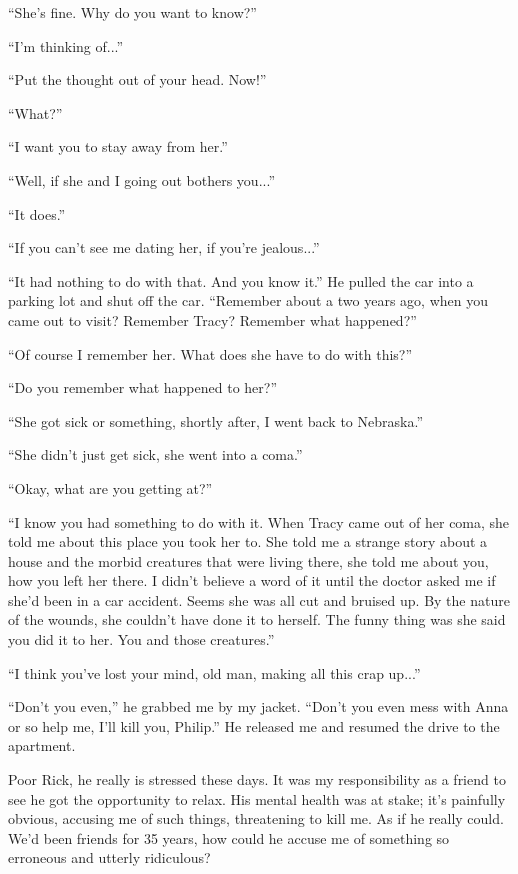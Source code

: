 \documentclass[
]{article}
\begin{document}
``She's fine. Why do you want to know?''

``I'm thinking of...''

``Put the thought out of your head. Now!''

``What?''

``I want you to stay away from her.''

``Well, if she and I going out bothers you...''

``It does.''

``If you can't see me dating her, if you're jealous...''

``It had nothing to do with that. And you know it.'' He pulled the car
into a parking lot and shut off the car. ``Remember about a two years
ago, when you came out to visit? Remember Tracy? Remember what
happened?''

``Of course I remember her. What does she have to do with this?''

``Do you remember what happened to her?''

``She got sick or something, shortly after, I went back to Nebraska.''

``She didn't just get sick, she went into a coma.''

``Okay, what are you getting at?''

``I know you had something to do with it. When Tracy came out of her
coma, she told me about this place you took her to. She told me a
strange story about a house and the morbid creatures that were living
there, she told me about you, how you left her there. I didn't believe a
word of it until the doctor asked me if she'd been in a car accident.
Seems she was all cut and bruised up. By the nature of the wounds, she
couldn't have done it to herself. The funny thing was she said you did
it to her. You and those creatures.''

``I think you've lost your mind, old man, making all this crap up...''

``Don't you even,'' he grabbed me by my jacket. ``Don't you even mess
with Anna or so help me, I'll kill you, Philip.'' He released me and
resumed the drive to the apartment.

Poor Rick, he really is stressed these days. It was my responsibility as
a friend to see he got the opportunity to relax. His mental health was
at stake; it's painfully obvious, accusing me of such things,
threatening to kill me. As if he really could. We'd been friends for 35
years, how could he accuse me of something so erroneous and utterly
ridiculous?
\end{document}
